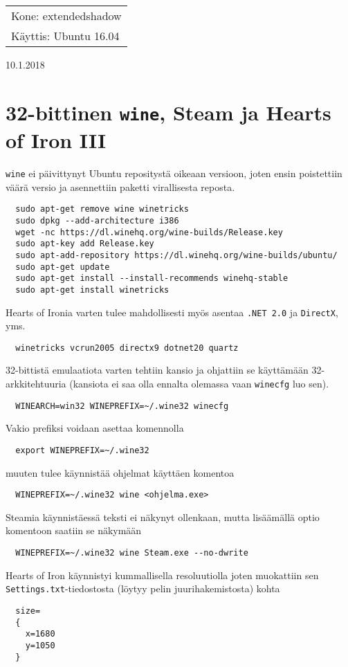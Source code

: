 \documentclass[main.tex]{subfiles}
\begin{document}
\thispagestyle{empty}
\begin{tabular}[t]{l}
Kone: extendedshadow\\
Käyttis: Ubuntu 16.04
\end{tabular}
\hfill 10.1.2018

\section{32-bittinen \texttt{wine}, Steam ja Hearts of Iron III}
\texttt{wine} ei päivittynyt Ubuntu repositystä oikeaan versioon, joten ensin poistettiin väärä versio ja asennettiin paketti virallisesta reposta.

\begin{lstlisting}
  sudo apt-get remove wine winetricks
  sudo dpkg --add-architecture i386
  wget -nc https://dl.winehq.org/wine-builds/Release.key
  sudo apt-key add Release.key
  sudo apt-add-repository https://dl.winehq.org/wine-builds/ubuntu/
  sudo apt-get update
  sudo apt-get install --install-recommends winehq-stable
  sudo apt-get install winetricks
\end{lstlisting}

Hearts of Ironia varten tulee mahdollisesti myös asentaa \texttt{.NET 2.0} ja \texttt{DirectX}, yms.

\begin{lstlisting}
  winetricks vcrun2005 directx9 dotnet20 quartz
\end{lstlisting}

32-bittistä emulaatiota varten tehtiin kansio ja ohjattiin se käyttämään 32-arkkitehtuuria (kansiota ei saa olla ennalta olemassa vaan \texttt{winecfg} luo sen).

\begin{lstlisting}
  WINEARCH=win32 WINEPREFIX=~/.wine32 winecfg
\end{lstlisting}

Vakio prefiksi voidaan asettaa komennolla

\begin{lstlisting}
  export WINEPREFIX=~/.wine32
\end{lstlisting}

muuten tulee käynnistää ohjelmat käyttäen komentoa

\begin{lstlisting}
  WINEPREFIX=~/.wine32 wine <ohjelma.exe>
\end{lstlisting}

Steamia käynnistäessä teksti ei näkynyt ollenkaan, mutta lisäämällä optio komentoon saatiin se näkymään

\begin{lstlisting}
  WINEPREFIX=~/.wine32 wine Steam.exe --no-dwrite
\end{lstlisting}

Hearts of Iron käynnistyi kummallisella resoluutiolla joten muokattiin sen \texttt{Settings.txt}-tiedostosta (löytyy pelin juurihakemistosta) kohta

\begin{lstlisting}
  size=
  {
    x=1680
    y=1050
  }
\end{lstlisting}
\end{document}
